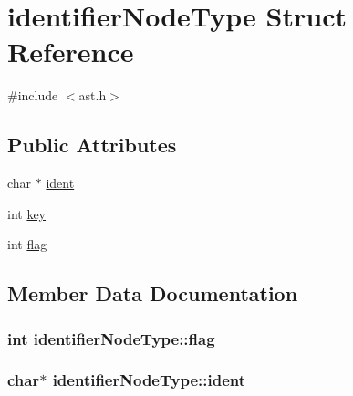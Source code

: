 \hypertarget{structidentifierNodeType}{}\section{identifier\+Node\+Type Struct Reference}
\label{structidentifierNodeType}


{\ttfamily \#include $<$ast.\+h$>$}

\subsection*{Public Attributes}
\begin{DoxyCompactItemize}
\item 
char $\ast$ \hyperlink{structidentifierNodeType_a809e997f6bede0a31d4eeac0b69847d2}{ident}
\item 
int \hyperlink{structidentifierNodeType_af46293c8242bffa382258675b7401572}{key}
\item 
int \hyperlink{structidentifierNodeType_a03c64619a65bc943db71d81a69054332}{flag}
\end{DoxyCompactItemize}


\subsection{Member Data Documentation}
\subsubsection[{\texorpdfstring{flag}{flag}}]{\setlength{\rightskip}{0pt plus 5cm}int identifier\+Node\+Type\+::flag}\hypertarget{structidentifierNodeType_a03c64619a65bc943db71d81a69054332}{}\label{structidentifierNodeType_a03c64619a65bc943db71d81a69054332}
\subsubsection[{\texorpdfstring{ident}{ident}}]{\setlength{\rightskip}{0pt plus 5cm}char$\ast$ identifier\+Node\+Type\+::ident}\hypertarget{structidentifierNodeType_a809e997f6bede0a31d4eeac0b69847d2}{}\label{structidentifierNodeType_a809e997f6bede0a31d4eeac0b69847d2}
